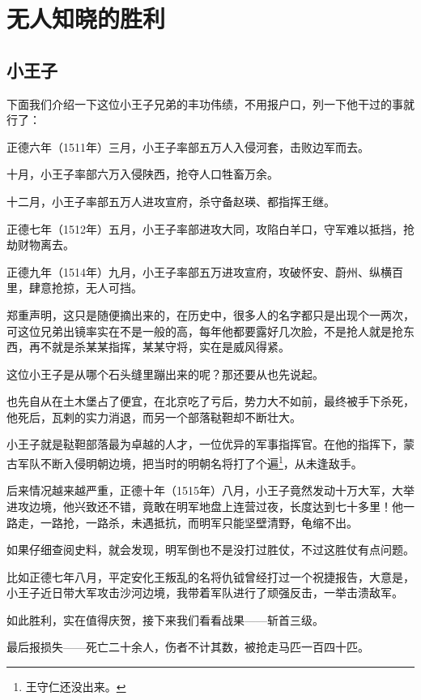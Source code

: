 \section{无人知晓的胜利}
\ifnum{}
	\begin{multicols}{\theparacolNo}
		\fi
		\subsection{小王子}
		下面我们介绍一下这位小王子兄弟的丰功伟绩，不用报户口，列一下他干过的事就行了：

		正德六年（1511年）三月，小王子率部五万人入侵河套，击败边军而去。

		十月，小王子率部六万入侵陕西，抢夺人口牲畜万余。

		十二月，小王子率部五万人进攻宣府，杀守备赵瑛、都指挥王继。

		正德七年（1512年）五月，小王子率部进攻大同，攻陷白羊口，守军难以抵挡，抢劫财物离去。

		正德九年（1514年）九月，小王子率部五万进攻宣府，攻破怀安、蔚州、纵横百里，肆意抢掠，无人可挡。

		郑重声明，这只是随便摘出来的，在历史中，很多人的名字都只是出现个一两次，可这位兄弟出镜率实在不是一般的高，每年他都要露好几次脸，不是抢人就是抢东西，再不就是杀某某指挥，某某守将，实在是威风得紧。

		这位小王子是从哪个石头缝里蹦出来的呢？那还要从也先说起。

		也先自从在土木堡占了便宜，在北京吃了亏后，势力大不如前，最终被手下杀死，他死后，瓦剌的实力消退，而另一个部落鞑靼却不断壮大。

		小王子就是鞑靼部落最为卓越的人才，一位优异的军事指挥官。在他的指挥下，蒙古军队不断入侵明朝边境，把当时的明朝名将打了个遍\footnote{王守仁还没出来。}，从未逢敌手。

		后来情况越来越严重，正德十年（1515年）八月，小王子竟然发动十万大军，大举进攻边境，他兴致还不错，竟敢在明军地盘上连营过夜，长度达到七十多里！他一路走，一路抢，一路杀，未遇抵抗，而明军只能坚壁清野，龟缩不出。

		如果仔细查阅史料，就会发现，明军倒也不是没打过胜仗，不过这胜仗有点问题。

		比如正德七年八月，平定安化王叛乱的名将仇钺曾经打过一个祝捷报告，大意是，小王子近日带大军攻击沙河边境，我带着军队进行了顽强反击，一举击溃敌军。

		如此胜利，实在值得庆贺，接下来我们看看战果——斩首三级。

		最后报损失——死亡二十余人，伤者不计其数，被抢走马匹一百四十匹。


\end{multicols}
